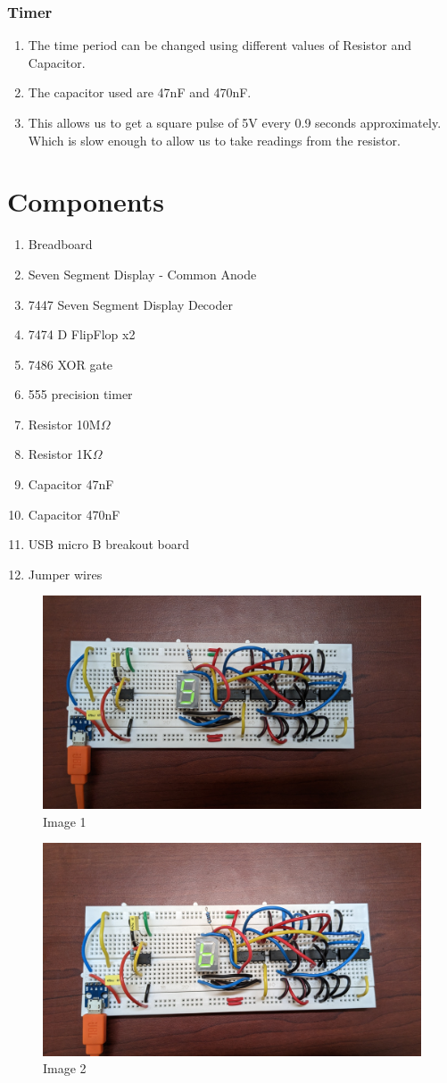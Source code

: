 \documentclass{article}
\begin{document}
\subsubsection{Timer}
\begin{enumerate}
\item The time period can be changed using different values of Resistor and Capacitor.
\item The capacitor used are 47nF and 470nF.
\item This allows us to get a square pulse of 5V every 0.9 seconds approximately. Which is slow enough to allow us to take readings from the resistor.
\end{enumerate}
\section{Components}
\begin{enumerate}
\item Breadboard
\item Seven Segment Display - Common Anode
\item 7447 Seven Segment Display Decoder
\item 7474 D FlipFlop x2
\item 7486 XOR gate
\item 555 precision timer
\item Resistor 10M$\Omega$
\item Resistor 1K$\Omega$
\item Capacitor 47nF
\item Capacitor 470nF
\item USB micro B breakout board
\item Jumper wires
\end{enumerate}
\begin{figure}[ht]
\centering
\includegraphics[width=0.7\linewidth]{images/5.jpg}
\caption{Image 1}
\end{figure}
\FloatBarrier
\begin{figure}[ht]
\centering
\includegraphics[width=0.7\linewidth]{images/6.jpg}
\caption{Image 2}
\end{figure}
\end{document}
